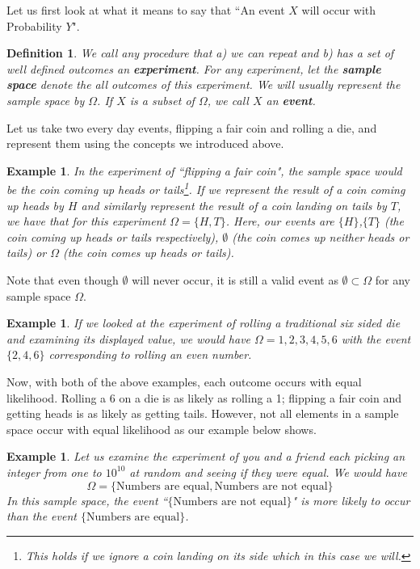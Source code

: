 \documentclass[12pt,a4paper]{article}
\newtheorem{definition}[theorem]{Definition}
\newtheorem{example}[theorem]{Example}
\begin{document}
Let us first look at what it means to say that ``An event $X$ will occur with
Probability $Y$". 

\begin{definition}
We call any procedure that a) we can repeat and b) has a set of well defined
outcomes an \textbf{experiment}. For any experiment, let the \textbf{sample
space} denote the all outcomes of this experiment. We will usually represent the
sample space by $\Omega$. If $X$ is a subset of $\Omega$, we call $X$ an
\textbf{event}.
\end{definition}

Let us take two every day events, flipping a fair coin and rolling a die, and
represent them using the concepts we introduced above.
\begin{example}
\label{exm:coin_events}
In the experiment of ``flipping a fair coin", the sample space would be the coin
coming up heads or tails\footnote{This holds if we ignore a coin landing on its side which
in this case we will.}. If we represent the result of a coin coming up
heads by $H$ and similarly represent the result of a coin landing on tails by
$T$, we have that for this experiment $\Omega = \{H,T\}$. Here, our events
are $\{H\}$,$\{T\}$ (the coin coming up heads or tails respectively),
$\emptyset$ (the coin comes up neither heads or tails) or $\Omega$ (the coin
comes up heads or tails).
\end{example}

Note that even though $\emptyset$ will never occur,
it is still a valid event as $\emptyset \subset \Omega$ for any sample space
$\Omega$.

\begin{example}
If we looked at the experiment of rolling a traditional six sided die and
examining its displayed value, we would have $\Omega = {1,2,3,4,5,6}$ with the
event $\{2,4,6\}$ corresponding to rolling an even number.
\end{example}

Now, with both of the above examples, each outcome occurs with equal
likelihood.  Rolling a 6 on a die is as likely as rolling a 1; flipping a fair
coin and getting heads is as likely as getting tails. However, not all elements
in a sample space occur with equal likelihood as our example below shows.
\begin{example}
\label{exm:picking}
Let us examine the experiment of you and a friend each picking an integer from
one to $10^{10}$ at random and seeing if they were equal. We would have 
\[\Omega =
\{\mbox{Numbers are equal},\mbox{Numbers are not equal}\}\]
In this sample
space, the event ``$\{\mbox{Numbers are not equal}\}$" is more likely to occur
than the event $\{\mbox{Numbers are equal}\}$.
\end{example}
\end{document}

